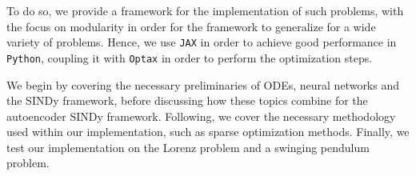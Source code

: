 To do so, we provide a framework for the implementation of such problems, with the focus on modularity in order for the framework to generalize for a wide variety of problems. Hence, we use \verb|JAX| \cite{jax2018github} in order to achieve good performance in \verb|Python|, coupling it with \verb|Optax| \cite{deepmind2020jax} in order to perform the optimization steps. 

We begin by covering the necessary preliminaries of ODEs, neural networks and the SINDy framework, before discussing how these topics combine for the autoencoder SINDy framework. Following, we cover the necessary methodology used within our implementation, such as sparse optimization methods. Finally, we test our implementation on the Lorenz problem and a swinging pendulum problem.%